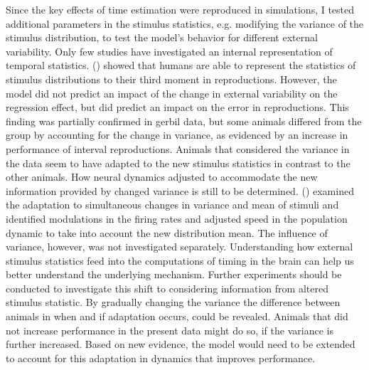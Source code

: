 \documentclass[10pt]{article}
\begin{document}
Since the key effects of time estimation were reproduced in simulations, I tested additional parameters in the stimulus statistics, e.g. modifying the variance of the stimulus distribution, to test the model's behavior for different external variability.
Only few studies have investigated an internal representation of temporal statistics. \citeauthor{Acerbi2012} (\citeyear{Acerbi2012}) showed that humans are able to represent the statistics of stimulus distributions to their third moment in reproductions.  
However, the model did not predict an impact of the change in external variability on the regression effect, but did predict an impact on the error in reproductions.
This finding was partially confirmed in gerbil data, but some animals differed from the group by accounting for the change in variance, as evidenced by an increase in performance of interval reproductions.
Animals that considered the variance in the data seem to have adapted to the new stimulus statistics in contrast to the other animals. 
How neural dynamics adjusted to accommodate the new information provided by changed variance is still to be determined.
\citeauthor{Meirhaeghe2021} (\citeyear{Meirhaeghe2021}) examined the adaptation to simultaneous changes in variance and mean of stimuli and identified modulations in the firing rates and adjusted speed in the population dynamic to take into account the new distribution mean. The influence of variance, however, was not investigated separately. 
Understanding how external stimulus statistics feed into the computations of timing in the brain can help us better understand the underlying mechanism. 
Further experiments should be conducted to investigate this shift to considering information from altered stimulus statistic. 
By gradually changing the variance the difference between animals in when and if adaptation occurs, could be revealed. 
Animals that did not increase performance in the present data might do so, if the variance is further increased.
Based on new evidence, the model would need to be extended to account for this adaptation in dynamics that improves performance.
\end{document}

